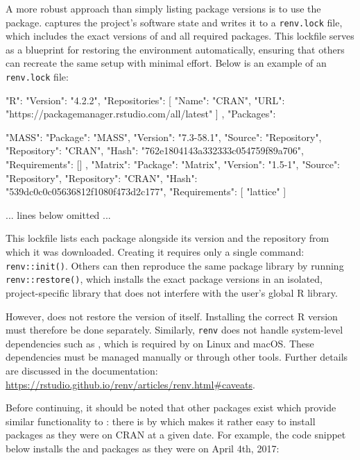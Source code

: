 \documentclass[
  article]{jss}
\begin{document}
A more robust approach than simply listing package versions is to use
the  package.  captures the project's software state
and writes it to a \texttt{renv.lock} file, which includes the exact
versions of  and all required packages. This lockfile serves
as a blueprint for restoring the environment automatically, ensuring
that others can recreate the same setup with minimal effort. Below is an
example of an \texttt{renv.lock} file:

\begin{Code}
{
  "R": {
    "Version": "4.2.2",
    "Repositories": [
      {
        "Name": "CRAN",
        "URL": "https://packagemanager.rstudio.com/all/latest"
      }
    ]
  },
  "Packages": {
    "MASS": {
      "Package": "MASS",
      "Version": "7.3-58.1",
      "Source": "Repository",
      "Repository": "CRAN",
      "Hash": "762e1804143a332333c054759f89a706",
      "Requirements": []
    },
    "Matrix": {
      "Package": "Matrix",
      "Version": "1.5-1",
      "Source": "Repository",
      "Repository": "CRAN",
      "Hash": "539dc0c0c05636812f1080f473d2c177",
      "Requirements": [
        "lattice"
      ]
    }
    
    ... lines below omitted ...
  }
}
\end{Code}

This lockfile lists each package alongside its version and the
repository from which it was downloaded. Creating it requires only a
single command: \texttt{renv::init()}. Others can then reproduce the
same package library by running \texttt{renv::restore()}, which installs
the exact package versions in an isolated, project-specific library that
does not interfere with the user's global R library.

However,  does not restore the version of  itself.
Installing the correct R version must therefore be done separately.
Similarly, \texttt{renv} does not handle system-level dependencies such
as , which is required by  on Linux and
macOS. These dependencies must be managed manually or through other
tools. Further details are discussed in the  documentation:
\url{https://rstudio.github.io/renv/articles/renv.html#caveats}.

Before continuing, it should be noted that other packages exist which
provide similar functionality to : there is  by
\citet{simonsohn2023} which makes it rather easy to install packages as
they were on CRAN at a given date. For example, the code snippet below
installs the  and  packages as they were on
April 4th, 2017:
\end{document}

